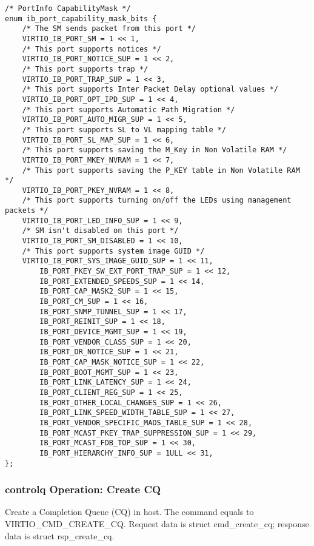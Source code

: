 \begin{lstlisting}
/* PortInfo CapabilityMask */
enum ib_port_capability_mask_bits {
    /* The SM sends packet from this port */ 
    VIRTIO_IB_PORT_SM = 1 << 1,
    /* This port supports notices */
    VIRTIO_IB_PORT_NOTICE_SUP = 1 << 2,
    /* This port supports trap */
    VIRTIO_IB_PORT_TRAP_SUP = 1 << 3,
    /* This port supports Inter Packet Delay optional values */
    VIRTIO_IB_PORT_OPT_IPD_SUP = 1 << 4,
    /* This port supports Automatic Path Migration */
    VIRTIO_IB_PORT_AUTO_MIGR_SUP = 1 << 5,
    /* This port supports SL to VL mapping table */
    VIRTIO_IB_PORT_SL_MAP_SUP = 1 << 6,
    /* This port supports saving the M_Key in Non Volatile RAM */
    VIRTIO_IB_PORT_MKEY_NVRAM = 1 << 7,
    /* This port supports saving the P_KEY table in Non Volatile RAM */
    VIRTIO_IB_PORT_PKEY_NVRAM = 1 << 8,
    /* This port supports turning on/off the LEDs using management packets */
    VIRTIO_IB_PORT_LED_INFO_SUP = 1 << 9,
    /* SM isn't disabled on this port */
    VIRTIO_IB_PORT_SM_DISABLED = 1 << 10,
    /* This port supports system image GUID */
    VIRTIO_IB_PORT_SYS_IMAGE_GUID_SUP = 1 << 11,
        IB_PORT_PKEY_SW_EXT_PORT_TRAP_SUP = 1 << 12,
        IB_PORT_EXTENDED_SPEEDS_SUP = 1 << 14,
        IB_PORT_CAP_MASK2_SUP = 1 << 15,
        IB_PORT_CM_SUP = 1 << 16,
        IB_PORT_SNMP_TUNNEL_SUP = 1 << 17,
        IB_PORT_REINIT_SUP = 1 << 18,
        IB_PORT_DEVICE_MGMT_SUP = 1 << 19,
        IB_PORT_VENDOR_CLASS_SUP = 1 << 20,
        IB_PORT_DR_NOTICE_SUP = 1 << 21,
        IB_PORT_CAP_MASK_NOTICE_SUP = 1 << 22,
        IB_PORT_BOOT_MGMT_SUP = 1 << 23,
        IB_PORT_LINK_LATENCY_SUP = 1 << 24,
        IB_PORT_CLIENT_REG_SUP = 1 << 25,
        IB_PORT_OTHER_LOCAL_CHANGES_SUP = 1 << 26,
        IB_PORT_LINK_SPEED_WIDTH_TABLE_SUP = 1 << 27,
        IB_PORT_VENDOR_SPECIFIC_MADS_TABLE_SUP = 1 << 28,
        IB_PORT_MCAST_PKEY_TRAP_SUPPRESSION_SUP = 1 << 29,
        IB_PORT_MCAST_FDB_TOP_SUP = 1 << 30,
        IB_PORT_HIERARCHY_INFO_SUP = 1ULL << 31,
};
\end{lstlisting}

\subsubsection{controlq Operation: Create CQ}\label{sec:Device Types / RDMA Device / controlq Operation / Create CQ}

Create a Completion Queue (CQ) in host. The command equals to VIRTIO_CMD_CREATE_CQ.
Request data is struct cmd_create_cq; response data is struct rsp_create_cq.

